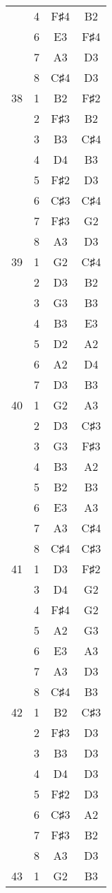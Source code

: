 \documentclass{article}
\begin{document}
\begin{longtable}{|c|c|c|c|}
  & 4 & F♯4 & B2 \\ 
  & 6 & E3 & F♯4 \\ 
  & 7 & A3 & D3 \\ 
  & 8 & C♯4 & D3 \\ 
\hline
38 & 1 & B2 & F♯2 \\ 
  & 2 & F♯3 & B2 \\ 
  & 3 & B3 & C♯4 \\ 
  & 4 & D4 & B3 \\ 
  & 5 & F♯2 & D3 \\ 
  & 6 & C♯3 & C♯4 \\ 
  & 7 & F♯3 & G2 \\ 
  & 8 & A3 & D3 \\ 
\hline
39 & 1 & G2 & C♯4 \\ 
  & 2 & D3 & B2 \\ 
  & 3 & G3 & B3 \\ 
  & 4 & B3 & E3 \\ 
  & 5 & D2 & A2 \\ 
  & 6 & A2 & D4 \\ 
  & 7 & D3 & B3 \\ 
\hline
40 & 1 & G2 & A3 \\ 
  & 2 & D3 & C♯3 \\ 
  & 3 & G3 & F♯3 \\ 
  & 4 & B3 & A2 \\ 
  & 5 & B2 & B3 \\ 
  & 6 & E3 & A3 \\ 
  & 7 & A3 & C♯4 \\ 
  & 8 & C♯4 & C♯3 \\ 
\hline
41 & 1 & D3 & F♯2 \\ 
  & 3 & D4 & G2 \\ 
  & 4 & F♯4 & G2 \\ 
  & 5 & A2 & G3 \\ 
  & 6 & E3 & A3 \\ 
  & 7 & A3 & D3 \\ 
  & 8 & C♯4 & B3 \\ 
\hline
42 & 1 & B2 & C♯3 \\ 
  & 2 & F♯3 & D3 \\ 
  & 3 & B3 & D3 \\ 
  & 4 & D4 & D3 \\ 
  & 5 & F♯2 & D3 \\ 
  & 6 & C♯3 & A2 \\ 
  & 7 & F♯3 & B2 \\ 
  & 8 & A3 & D3 \\ 
\hline
43 & 1 & G2 & B3 \\ 

\end{longtable}
\end{document}

